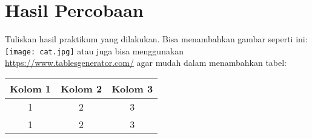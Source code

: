 \chapter{Hasil Percobaan}

Tuliskan hasil praktikum yang dilakukan. Bisa menambahkan gambar seperti ini:\\
\texttt{[image: cat.jpg]}
atau juga bisa menggunakan \url{https://www.tablesgenerator.com/} agar mudah dalam 
menambahkan tabel:
\begin{table}[h!]
\begin{tabular}{|c|c|c|}
\hline
\textbf{Kolom 1} & \textbf{Kolom 2} & \textbf{Kolom 3} \\ \hline
1                & 2                & 3                \\ \hline
1                & 2                & 3                \\ \hline
\end{tabular}
\end{table}